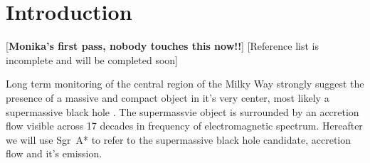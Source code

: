 \section{Introduction}\label{sec:intro}

\color{red}
[{\bf Monika's first pass, nobody touches this now!!}]
\color{green}
[Reference list is incomplete and will be completed soon]
\color{black}

Long term monitoring of the central region of the Milky Way strongly suggest the presence of a massive and compact object in it's very center, most likely a supermassive black hole \citep{2019A&A...625L..10G,2019Sci...365..664D}. The supermassvie object is surrounded by an accretion flow visible across 17 decades in frequency of electromagnetic spectrum. Hereafter we will use Sgr~A* to refer to the supermassive black hole candidate, accretion flow and it's emission.

